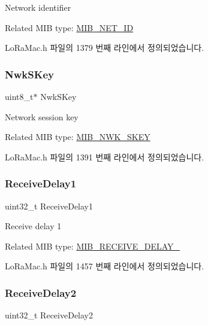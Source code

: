 Network identifier

Related M\+IB type\+: \mbox{\hyperlink{group___l_o_r_a_m_a_c_gga32ea83d13a3f5bb4b3ec2ace2319ab61a982c4b7cc1e276633134aa89298c96b0}{M\+I\+B\+\_\+\+N\+E\+T\+\_\+\+ID}} 

Lo\+Ra\+Mac.\+h 파일의 1379 번째 라인에서 정의되었습니다.

\mbox{\label{unionu_mib_param_a04e90b783b4e6841ecda8d32d10dc90e}} 
\subsubsection{\texorpdfstring{Nwk\+S\+Key}{NwkSKey}}
{\footnotesize\ttfamily uint8\+\_\+t$\ast$ Nwk\+S\+Key}

Network session key

Related M\+IB type\+: \mbox{\hyperlink{group___l_o_r_a_m_a_c_gga32ea83d13a3f5bb4b3ec2ace2319ab61a60d7688e714c9b140648aadd2e7ab36e}{M\+I\+B\+\_\+\+N\+W\+K\+\_\+\+S\+K\+EY}} 

Lo\+Ra\+Mac.\+h 파일의 1391 번째 라인에서 정의되었습니다.

\mbox{\label{unionu_mib_param_a426f0e1108ebe3ba1b05c2853c0b0c3a}} 
\subsubsection{\texorpdfstring{Receive\+Delay1}{ReceiveDelay1}}
{\footnotesize\ttfamily uint32\+\_\+t Receive\+Delay1}

Receive delay 1

Related M\+IB type\+: \mbox{\hyperlink{group___l_o_r_a_m_a_c_gga32ea83d13a3f5bb4b3ec2ace2319ab61aa3511cfca5a46654d97b022d50c82ae8}{M\+I\+B\+\_\+\+R\+E\+C\+E\+I\+V\+E\+\_\+\+D\+E\+L\+A\+Y\+\_}} 

Lo\+Ra\+Mac.\+h 파일의 1457 번째 라인에서 정의되었습니다.

\mbox{\label{unionu_mib_param_a67fbe3fba2eb31f8879ea22674dd50d8}} 
\subsubsection{\texorpdfstring{Receive\+Delay2}{ReceiveDelay2}}
{\footnotesize\ttfamily uint32\+\_\+t Receive\+Delay2}

